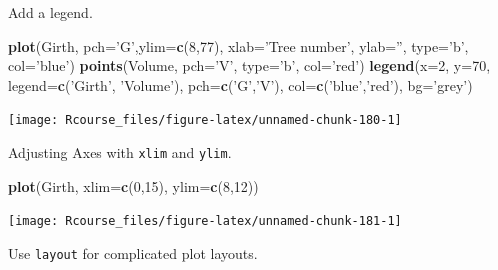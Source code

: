 \documentclass[]{book}
\newenvironment{Shaded}{\begin{snugshade}}{\end{snugshade}}
\newcommand{\KeywordTok}[1]{\textcolor[rgb]{0.13,0.29,0.53}{\textbf{{#1}}}}
\newcommand{\DataTypeTok}[1]{\textcolor[rgb]{0.13,0.29,0.53}{{#1}}}
\newcommand{\DecValTok}[1]{\textcolor[rgb]{0.00,0.00,0.81}{{#1}}}
\newcommand{\StringTok}[1]{\textcolor[rgb]{0.31,0.60,0.02}{{#1}}}
\newcommand{\NormalTok}[1]{{#1}}
\theoremstyle{definition}
\theoremstyle{definition}
\theoremstyle{remark}
\begin{document}
Add a legend.

\begin{Shaded}
\begin{Highlighting}[]
\KeywordTok{plot}\NormalTok{(Girth, }\DataTypeTok{pch=}\StringTok{'G'}\NormalTok{,}\DataTypeTok{ylim=}\KeywordTok{c}\NormalTok{(}\DecValTok{8}\NormalTok{,}\DecValTok{77}\NormalTok{), }\DataTypeTok{xlab=}\StringTok{'Tree number'}\NormalTok{, }\DataTypeTok{ylab=}\StringTok{''}\NormalTok{, }\DataTypeTok{type=}\StringTok{'b'}\NormalTok{, }\DataTypeTok{col=}\StringTok{'blue'}\NormalTok{)}
\KeywordTok{points}\NormalTok{(Volume, }\DataTypeTok{pch=}\StringTok{'V'}\NormalTok{, }\DataTypeTok{type=}\StringTok{'b'}\NormalTok{, }\DataTypeTok{col=}\StringTok{'red'}\NormalTok{)}
\KeywordTok{legend}\NormalTok{(}\DataTypeTok{x=}\DecValTok{2}\NormalTok{, }\DataTypeTok{y=}\DecValTok{70}\NormalTok{, }\DataTypeTok{legend=}\KeywordTok{c}\NormalTok{(}\StringTok{'Girth'}\NormalTok{, }\StringTok{'Volume'}\NormalTok{), }\DataTypeTok{pch=}\KeywordTok{c}\NormalTok{(}\StringTok{'G'}\NormalTok{,}\StringTok{'V'}\NormalTok{), }\DataTypeTok{col=}\KeywordTok{c}\NormalTok{(}\StringTok{'blue'}\NormalTok{,}\StringTok{'red'}\NormalTok{), }\DataTypeTok{bg=}\StringTok{'grey'}\NormalTok{)}
\end{Highlighting}
\end{Shaded}

\texttt{[image: Rcourse\_files/figure-latex/unnamed-chunk-180-1]}

Adjusting Axes with \texttt{xlim} and \texttt{ylim}.

\begin{Shaded}
\begin{Highlighting}[]
\KeywordTok{plot}\NormalTok{(Girth, }\DataTypeTok{xlim=}\KeywordTok{c}\NormalTok{(}\DecValTok{0}\NormalTok{,}\DecValTok{15}\NormalTok{), }\DataTypeTok{ylim=}\KeywordTok{c}\NormalTok{(}\DecValTok{8}\NormalTok{,}\DecValTok{12}\NormalTok{))}
\end{Highlighting}
\end{Shaded}

\texttt{[image: Rcourse\_files/figure-latex/unnamed-chunk-181-1]}

Use \texttt{layout} for complicated plot layouts.
\end{document}
